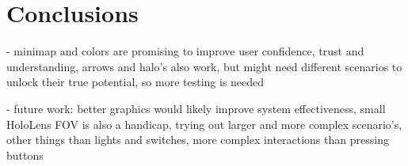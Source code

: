 \chapter{Conclusions} \label{chap:concl}
- minimap and colors are promising to improve user confidence, trust and understanding, arrows and halo's also work, but might need different scenarios to unlock their true potential, so more testing is needed

- future work: better graphics would likely improve system effectiveness, small HoloLens FOV is also a handicap, trying out larger and more complex scenario's, other things than lights and switches, more complex interactions than pressing buttons
